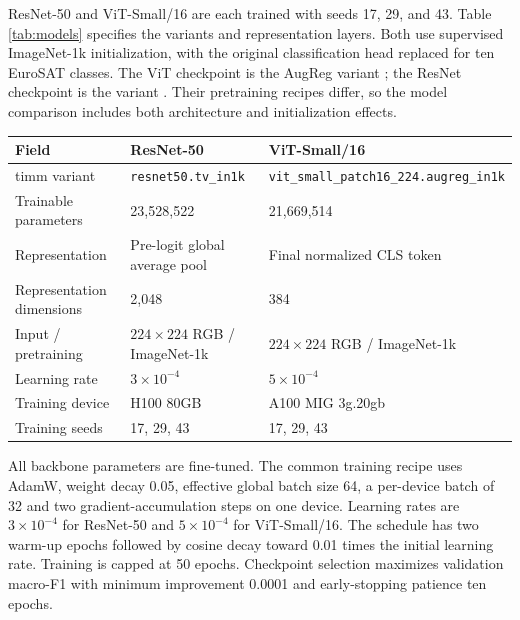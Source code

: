ResNet-50 and ViT-Small/16 are each trained with seeds 17, 29, and 43. Table \ref{tab:models} specifies the variants and representation layers. Both use supervised ImageNet-1k initialization, with the original classification head replaced for ten EuroSAT classes. The ViT checkpoint is the AugReg variant \cite{augreg,vitcard}; the ResNet checkpoint is the  variant \cite{rescard}. Their pretraining recipes differ, so the model comparison includes both architecture and initialization effects.

\stopcolumns
\noindent
\begin{minipage}{\textwidth}
\centering
{}\label{tab:models}
\begin{tabular}{lll}\toprule
Field & ResNet-50 & ViT-Small/16 \\\midrule
timm variant & \texttt{resnet50.tv\_in1k} & \texttt{vit\_small\_patch16\_224.augreg\_in1k} \\
Trainable parameters & 23,528,522 & 21,669,514 \\
Representation & Pre-logit global average pool & Final normalized CLS token \\
Representation dimensions & 2,048 & 384 \\
Input / pretraining & $224\times224$ RGB / ImageNet-1k & $224\times224$ RGB / ImageNet-1k \\
Learning rate & $3\times10^{-4}$ & $5\times10^{-4}$ \\
Training device & H100 80GB & A100 MIG 3g.20gb \\
Training seeds & 17, 29, 43 & 17, 29, 43 \\\bottomrule
\end{tabular}
\end{minipage}
\par\startcolumns

All backbone parameters are fine-tuned. The common training recipe uses AdamW, weight decay 0.05, effective global batch size 64, a per-device batch of 32 and two gradient-accumulation steps on one device. Learning rates are \(3\times10^{-4}\) for ResNet-50 and \(5\times10^{-4}\) for ViT-Small/16. The schedule has two warm-up epochs followed by cosine decay toward 0.01 times the initial learning rate. Training is capped at 50 epochs. Checkpoint selection maximizes validation macro-F1 with minimum improvement 0.0001 and early-stopping patience ten epochs.

